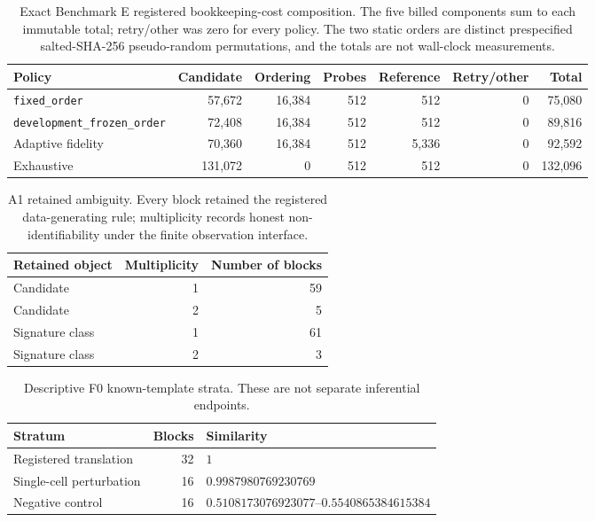 \begin{table}[htbp]
\centering
\small
\caption{Exact Benchmark E registered bookkeeping-cost composition. The five billed components
sum to each immutable total; retry/other was zero for every policy. The two static orders are
distinct prespecified salted-SHA-256 pseudo-random permutations, and the totals are not wall-clock
measurements.}
\label{tab:cost-components}
\begin{tabular}{lrrrrrr}
\toprule
Policy & Candidate & Ordering & Probes & Reference & Retry/other & Total\\
\midrule
\texttt{fixed\_order} & 57,672 & 16,384 & 512 & 512 & 0 & 75,080\\
\texttt{development\_frozen\_order} & 72,408 & 16,384 & 512 & 512 & 0 & 89,816\\
Adaptive fidelity & 70,360 & 16,384 & 512 & 5,336 & 0 & 92,592\\
Exhaustive & 131,072 & 0 & 512 & 512 & 0 & 132,096\\
\bottomrule
\end{tabular}
\end{table}

\begin{table}[ht]
\centering
\small
\caption{A1 retained ambiguity. Every block retained the registered data-generating rule;
multiplicity records
honest non-identifiability under the finite observation interface.}
\label{tab:a1-ambiguity}
\begin{tabular}{lrr}
\toprule
Retained object & Multiplicity & Number of blocks\\
\midrule
Candidate & 1 & 59\\
Candidate & 2 & 5\\
Signature class & 1 & 61\\
Signature class & 2 & 3\\
\bottomrule
\end{tabular}
\end{table}

\begin{table}[ht]
\centering
\small
\caption{Descriptive F0 known-template strata. These are not separate inferential endpoints.}
\label{tab:f0-strata}
\begin{tabular}{lrl}
\toprule
Stratum & Blocks & Similarity\\
\midrule
Registered translation & 32 & \(1\)\\
Single-cell perturbation & 16 & \(0.9987980769230769\)\\
Negative control & 16 & \(0.5108173076923077\)--\(0.5540865384615384\)\\
\bottomrule
\end{tabular}
\end{table}


